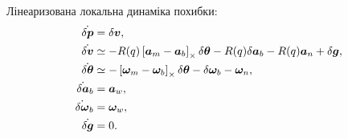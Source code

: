 Лінеаризована локальна динаміка похибки:
\begin{align}
\dot{\delta\bm{p}} &= \delta\bm{v},\\
\dot{\delta\bm{v}} &\simeq -R(q)\left[\bm{a}_m-\bm{a}_b\right]_{\times}\delta\bm{\theta}-R(q)\delta\bm{a}_b-R(q)\bm{a}_n+\delta\bm{g},\\
\dot{\delta\bm{\theta}} &\simeq -\left[\bm{\omega}_m-\bm{\omega}_b\right]_{\times}\delta\bm{\theta}-\delta\bm{\omega}_b-\bm{\omega}_n,\\
\dot{\delta\bm{a}}_b &= \bm{a}_w,\\
\dot{\delta\bm{\omega}}_b &= \bm{\omega}_w,\\
\dot{\delta\bm{g}} &= 0.
\end{align}
